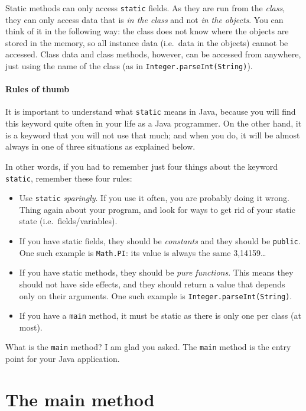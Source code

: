 Static methods can only access \verb+static+ fields. As they are
run from the \emph{class}, they can only access data that is \emph{in the class} and
not \emph{in the objects}. You can think of it in the following way: the
class does not know where the objects are stored in the memory, so
all instance data (i.e.~data in the objects) cannot be accessed. Class data and
class methods, however, can be accessed from anywhere, just using the
name of the class (as in \verb+Integer.parseInt(String)+). 

\paragraph{Rules of thumb}
\label{sec:rules-thumb-use}

It is important to understand what \verb+static+ means in Java,
because you will find this keyword quite often in your life as a Java
programmer. On the other hand, it is a keyword that you will not use
that much; and when you do, it will be almost always in one of three
situations as explained below. 

In other words, if you had to remember just four things about the keyword
\verb+static+, remember these four rules: 

\begin{itemize}
\item Use \verb+static+ \emph{sparingly}. If you use it often, you are
  probably doing it wrong. Thing again about your program, and look
  for ways to get rid of your static state (i.e.~fields/variables).
\item If you have static fields, they should be \emph{constants} and they
  should be \verb+public+. One such example is \verb+Math.PI+: its
  value is always the same 3,14159\ldots
\item If you have static methods, they should be \emph{pure functions}. This
  means they should not have side effects, and they should return a
  value that depends only on their arguments. One such example is
  \verb+Integer.parseInt(String)+.
\item If you have a \verb+main+ method, it must be static as there is
  only one per class (at most). 
\end{itemize}

What is the \verb+main+ method? I am glad you asked. The \verb+main+
method is the entry point for your Java application. 

\section{The main method}
\label{sec:main-method}

